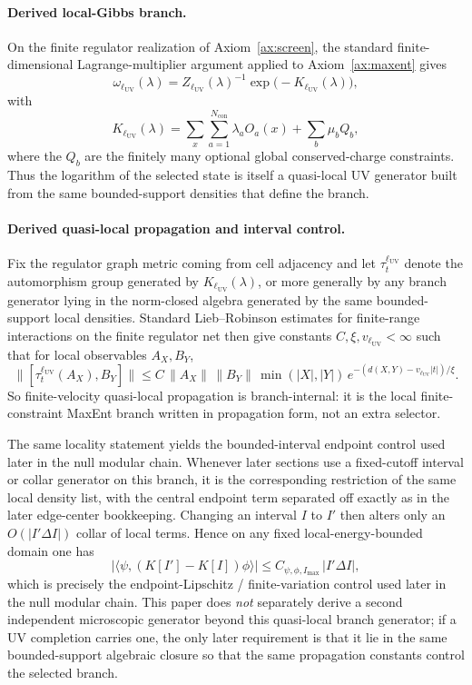 \documentclass[11pt]{article}
\begin{document}
\paragraph{Derived local-Gibbs branch.}
On the finite regulator realization of Axiom~\ref{ax:screen}, the standard finite-dimensional Lagrange-multiplier argument applied to Axiom~\ref{ax:maxent} gives
\[
\omega_{\ell_{\mathrm{UV}}}(\lambda)
=
Z_{\ell_{\mathrm{UV}}}(\lambda)^{-1}\exp\!\bigl(-K_{\ell_{\mathrm{UV}}}(\lambda)\bigr),
\]
with
\[
K_{\ell_{\mathrm{UV}}}(\lambda)
=
\sum_x \sum_{a=1}^{N_{\mathrm{con}}}\lambda_a O_a(x)
+\sum_b \mu_b Q_b,
\]
where the \(Q_b\) are the finitely many optional global conserved-charge constraints. Thus the logarithm of the selected state is itself a quasi-local UV generator built from the same bounded-support densities that define the branch.

\paragraph{Derived quasi-local propagation and interval control.}
Fix the regulator graph metric coming from cell adjacency and let \(\tau_t^{\ell_{\mathrm{UV}}}\) denote the automorphism group generated by \(K_{\ell_{\mathrm{UV}}}(\lambda)\), or more generally by any branch generator lying in the norm-closed algebra generated by the same bounded-support local densities. Standard Lieb--Robinson estimates for finite-range interactions on the finite regulator net then give constants \(C,\xi,v_{\ell_{\mathrm{UV}}}<\infty\) such that for local observables \(A_X,B_Y\), \cite{liebRobinson72}
\[
\bigl\|[\tau_t^{\ell_{\mathrm{UV}}}(A_X),B_Y]\bigr\|
\le
C\,\|A_X\|\,\|B_Y\|\,\min(|X|,|Y|)\,
e^{-(d(X,Y)-v_{\ell_{\mathrm{UV}}}|t|)/\xi}.
\]
So finite-velocity quasi-local propagation is branch-internal: it is the local finite-constraint MaxEnt branch written in propagation form, not an extra selector.

The same locality statement yields the bounded-interval endpoint control used later in the null modular chain. Whenever later sections use a fixed-cutoff interval or collar generator on this branch, it is the corresponding restriction of the same local density list, with the central endpoint term separated off exactly as in the later edge-center bookkeeping. Changing an interval \(I\) to \(I'\) then alters only an \(O(|I'\Delta I|)\) collar of local terms. Hence on any fixed local-energy-bounded domain one has
\[
\left|\langle\psi,(K[I']-K[I])\phi\rangle\right|
\le
C_{\psi,\phi,I_{\max}}\,|I'\Delta I|,
\]
which is precisely the endpoint-Lipschitz / finite-variation control used later in the null modular chain. This paper does \emph{not} separately derive a second independent microscopic generator beyond this quasi-local branch generator; if a UV completion carries one, the only later requirement is that it lie in the same bounded-support algebraic closure so that the same propagation constants control the selected branch.
\end{document}
